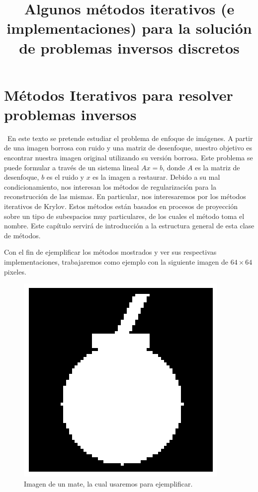 \documentclass[12pt, oneside]{book}
\title{Algunos métodos iterativos (e implementaciones) para la solución de problemas inversos discretos}
\author{}
\date{}
\begin{document}
	\maketitle
	\tableofcontents
	
	
	\chapter{Métodos Iterativos para resolver problemas inversos}
	\ En este texto se pretende estudiar el problema de enfoque de imágenes. A partir de una imagen borrosa con ruido y una matriz de desenfoque, nuestro objetivo es encontrar nuestra imagen original utilizando su versión borrosa. Este problema se puede formular a través de un sistema lineal $Ax = b$, donde $A$ es la matriz de desenfoque, $b$ es el ruido y $x$ es la imagen a restaurar. Debido a su mal condicionamiento, nos interesan los métodos de regularización para la reconstrucción de las mismas. En particular, nos interesaremos por los métodos iterativos de Krylov. Estos métodos están basados en procesos de proyección sobre un tipo de subespacios muy particulares, de los cuales el método toma el nombre. Este capítulo servirá de introducción a la estructura general de esta clase de métodos.
	
	Con el fin de ejemplificar los métodos mostrados y ver sus respectivas implementaciones, trabajaremos como ejemplo con la siguiente imagen de $64\times 64$ pixeles.
	
	\begin{figure}[H]
		\centering
		\includegraphics[scale=0.5]{Imagenes/x_true.png}
		\caption{Imagen de un mate, la cual usaremos para ejemplificar.\\}
	\end{figure}
	
\end{document}
